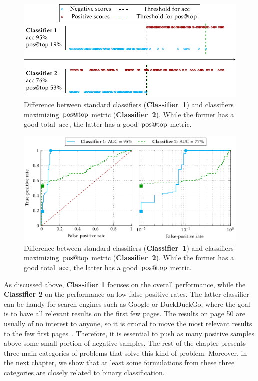 \begin{figure}
  \centering
  \includegraphics{images/standard_aatp_comparison.pdf}
  \caption{Difference between standard classifiers (\textbf{Classifier~1}) and classifiers maximizing~$\operatorname{pos@top}$ metric (\textbf{Classifier~2}). While the former has a good total~$\operatorname{acc}$, the latter has a good~$\operatorname{pos@top}$ metric.}
  \label{fig: standard vs. aatp}
\end{figure}

\begin{figure}
  \centering
  \includegraphics{images/roc_space_log.pdf}
  \caption{Difference between standard classifiers (\textbf{Classifier~1}) and classifiers maximizing~$\operatorname{pos@top}$ metric (\textbf{Classifier~2}). While the former has a good total~$\operatorname{acc}$, the latter has a good~$\operatorname{pos@top}$ metric.}
  \label{fig: roc space log}
\end{figure}

As discussed above, \textbf{Classifier 1} focuses on the overall performance, while the  \textbf{Classifier 2} on the performance on low false-positive rates. The latter classifier can be handy for search engines such as Google or DuckDuckGo, where the goal is to have all relevant results on the first few pages. The results on page 50 are usually of no interest to anyone, so it is crucial to move the most relevant results to the few first pages~\cite{cortes2003auc}. Therefore, it is essential to push as many positive samples above some small portion of negative samples. The rest of the chapter presents three main categories of problems that solve this kind of problem. Moreover, in the next chapter, we show that at least some formulations from these three categories are closely related to binary classification.

